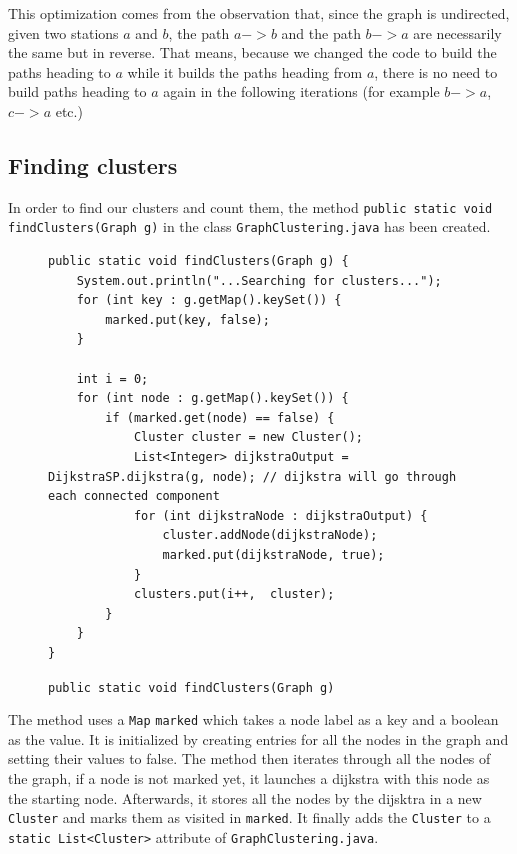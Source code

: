 \documentclass{article}
\begin{document}
\medbreak

This optimization comes from the observation that, since the graph is undirected, given two stations $a$ and $b$, the path $a->b$ and the path $b->a$ are necessarily the same but in reverse. That means, because we changed the code to build the paths heading to $a$ while it builds the paths heading from $a$, there is no need to build paths heading to $a$ again in the following iterations (for example $b->a$, $c->a$ etc.)

\newpage

\subsection{Finding clusters}

In order to find our clusters and count them, the method \texttt{public static void findClusters(Graph g)} in the class \texttt{GraphClustering.java} has been created. 

\begin{figure}[h]
\begin{verbatim}
public static void findClusters(Graph g) {
	System.out.println("...Searching for clusters...");
	for (int key : g.getMap().keySet()) {
		marked.put(key, false);
	}
	
	int i = 0;
	for (int node : g.getMap().keySet()) {
		if (marked.get(node) == false) {
			Cluster cluster = new Cluster();
			List<Integer> dijkstraOutput = DijkstraSP.dijkstra(g, node); // dijkstra will go through each connected component
			for (int dijkstraNode : dijkstraOutput) {
				cluster.addNode(dijkstraNode);
				marked.put(dijkstraNode, true);
			}
			clusters.put(i++,  cluster);
		}
	}
}
\end{verbatim}
\caption{\texttt{public static void findClusters(Graph g)}}
\end{figure}
The method uses a \texttt{Map} \texttt{marked} which takes a node label as a key and a boolean as the value. It is initialized by creating entries for all the nodes in the graph and setting their values to false. The method then iterates through all the nodes of the graph, if a node is not marked yet, it launches a dijkstra with this node as the starting node. Afterwards, it stores all the nodes by the dijsktra in a new \texttt{Cluster} and marks them as visited in \texttt{marked}. It finally adds the \texttt{Cluster} to a \texttt{static List<Cluster>} attribute of \texttt{GraphClustering.java}.
\end{document}
